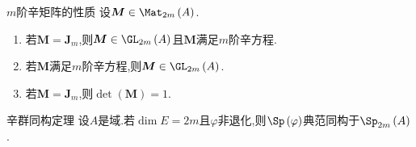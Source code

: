\begin{proposition}{$m$阶辛矩阵的性质}{}
	设$\boldsymbol{M}\in\Mat_{2m}\left(A\right)$.
	\begin{enumerate}
		\item 若$\boldsymbol{M}=\boldsymbol{J}_{m}$,则$\boldsymbol{M}\in\GL_{2m}\left(A\right)$且$\boldsymbol{M}$满足$m$阶辛方程.
		\item 若$\boldsymbol{M}$满足$m$阶辛方程,则$\boldsymbol{M}\in\GL_{2m}\left(A\right)$.
		\item 若$\boldsymbol{M}=\boldsymbol{J}_{m}$,则$\det\left(\boldsymbol{M}\right)=1$.
	\end{enumerate}
\end{proposition}

\begin{corollary}{辛群同构定理}{}
	设$A$是域.若$\dim E=2m$且$\varphi$非退化,则$\Sp\left(\varphi\right)$典范同构于$\Sp_{2m}\left(A\right)$.
\end{corollary}